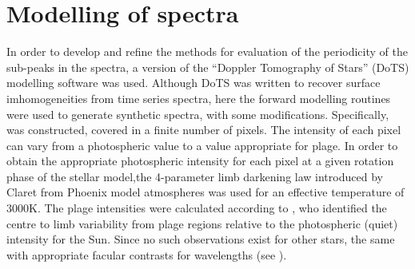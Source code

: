 \chapter{Modelling of {\prox} spectra}
\protect\label{chapter:modelling}

In order to develop and refine the methods for evaluation of the periodicity of the sub-peaks in the {\prox} spectra, a
version of the ``Doppler Tomography of Stars'' (DoTS) modelling software \citep{CCamerondotsa} was used. Although DoTS
was written to recover surface imhomogeneities from time series spectra, here the forward modelling routines were used
to generate synthetic spectra, with some modifications. Specifically,  was constructed, covered in a finite number of pixels. The intensity of each pixel
can vary from a photospheric value to a value appropriate for plage. In order to obtain the appropriate photospheric
intensity for each pixel at a given rotation phase of the stellar model,the 4-parameter limb darkening law introduced by
Claret from Phoenix model atmospheres \citep{claret00a} was used for an effective temperature of 3000K. The plage
intensities were calculated according to \citet[Section 4.1]{unruh99}, who identified the centre to limb variability
from plage regions relative to the photospheric (quiet) intensity for the Sun. Since no such observations exist for
other stars, the same  with appropriate facular contrasts for {\ha} wavelengths (see \citet[figs 3 \& 4]{unruh99}).

